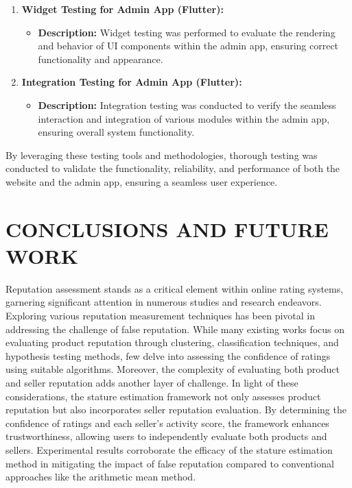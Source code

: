 \documentclass[12pt,a4paper]{report}
\begin{document}
\begin{enumerate}
    \item \textbf{Widget Testing for Admin App (Flutter):}
          \begin{itemize}
              \item \textbf{Description:} Widget testing was performed to evaluate the rendering and behavior of UI components within the admin app, ensuring correct functionality and appearance.
          \end{itemize}

    \item \textbf{Integration Testing for Admin App (Flutter):}
          \begin{itemize}
              \item \textbf{Description:} Integration testing was conducted to verify the seamless interaction and integration of various modules within the admin app, ensuring overall system functionality.
          \end{itemize}
\end{enumerate}

By leveraging these testing tools and methodologies, thorough testing was conducted to validate the functionality, reliability, and performance of both the website and the admin app, ensuring a seamless user experience.

\chapter{CONCLUSIONS AND FUTURE WORK}

Reputation assessment stands as a critical element within online rating systems, garnering significant attention in numerous studies and research endeavors. Exploring various reputation measurement techniques has been pivotal in addressing the challenge of false reputation. While many existing works focus on evaluating product reputation through clustering, classification techniques, and hypothesis testing methods, few delve into assessing the confidence of ratings using suitable algorithms. Moreover, the complexity of evaluating both product and seller reputation adds another layer of challenge. In light of these considerations, the stature estimation framework not only assesses product reputation but also incorporates seller reputation evaluation. By determining the confidence of ratings and each seller's activity score, the framework enhances trustworthiness, allowing users to independently evaluate both products and sellers. Experimental results corroborate the efficacy of the stature estimation method in mitigating the impact of false reputation compared to conventional approaches like the arithmetic mean method.
\end{document}
